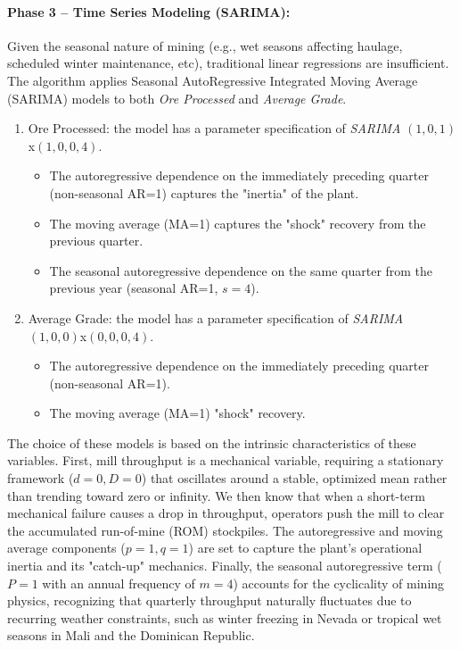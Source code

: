 \paragraph{Phase 3 -- Time Series Modeling (SARIMA):}
Given the seasonal nature of mining (e.g., wet seasons affecting haulage, scheduled winter maintenance, etc), traditional linear regressions are insufficient. The algorithm applies Seasonal AutoRegressive Integrated Moving Average (SARIMA) models to both \textit{Ore Processed} and \textit{Average Grade}. 

\begin{enumerate}
\item Ore Processed: the model has a parameter specification of \textit{SARIMA} $(1,0,1)$x$(1,0,0,4)$. 
    \begin{itemize}
        \item The autoregressive dependence on the immediately preceding quarter (non-seasonal AR=1) captures the "inertia" of the plant.
        \item The moving average (MA=1) captures the "shock" recovery from the previous quarter.
        \item The seasonal autoregressive dependence on the same quarter from the previous year (seasonal AR=1, $s=4$).
    \end{itemize}

\item Average Grade: the model has a parameter specification of \textit{SARIMA} $(1,0,0)$x$(0,0,0,4)$. 
    \begin{itemize}
        \item The autoregressive dependence on the immediately preceding quarter (non-seasonal AR=1).
        \item The moving average (MA=1) "shock" recovery.
    \end{itemize}
\end{enumerate}

The choice of these models is based on the intrinsic characteristics of these variables. First, mill throughput is a mechanical variable, requiring a stationary framework ($d=0, D=0$) that oscillates around a stable, optimized mean rather than trending toward zero or infinity. We then know that when a short-term mechanical failure causes a drop in throughput, operators push the mill to clear the accumulated run-of-mine (ROM) stockpiles. The autoregressive and moving average components ($p=1, q=1$) are set to capture the plant's operational inertia and its "catch-up" mechanics.  Finally, the seasonal autoregressive term ($P=1$ with an annual frequency of $m=4$) accounts for the cyclicality of mining physics, recognizing that quarterly throughput naturally fluctuates due to recurring weather constraints, such as winter freezing in Nevada or tropical wet seasons in Mali and the Dominican Republic. 

